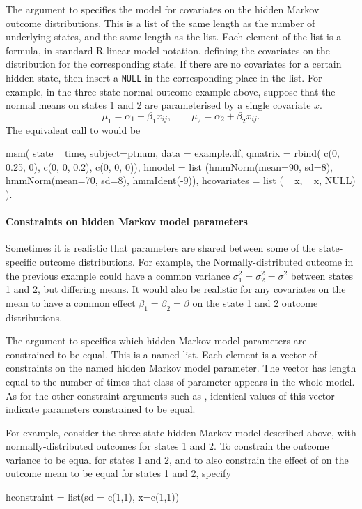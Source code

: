 The  argument to  specifies the
model for covariates on the hidden Markov outcome distributions.  This
is a list of the same length as the number of underlying states, and
the same length as the  list.  Each element of the
list is a formula, in standard R linear model notation, defining the
covariates on the distribution for the corresponding state.  If there
are no covariates for a certain hidden state, then insert a \texttt{NULL} in
the corresponding place in the list.  For example, in the three-state
normal-outcome example above, suppose that the normal means on states
1 and 2 are parameterised by a single covariate $x$.
\[
\mu_1 = \alpha_1 + \beta_1 x_{ij}, \qquad \mu_2 = \alpha_2 + \beta_2 x_{ij}.
\]
The equivalent call to  would be
\begin{Scode}
  msm( state ~ time, subject=ptnum, data = example.df,
  qmatrix = rbind( c(0, 0.25, 0), c(0, 0, 0.2), c(0, 0, 0)),
  hmodel = list (hmmNorm(mean=90, sd=8), hmmNorm(mean=70, sd=8),
                 hmmIdent(-9)),
  hcovariates = list ( ~ x, ~ x, NULL)
 ).
\end{Scode}



\paragraph{Constraints on hidden Markov model parameters}

Sometimes it is realistic that parameters are shared between some of
the state-specific outcome distributions.  For example, the
Normally-distributed outcome in the previous example could have a
common variance $\sigma^2_1 = \sigma^2_2 = \sigma^2$ between states 1
and 2, but differing means.  It would also be realistic for any
covariates on the mean to have a common effect $\beta_1 = \beta_2 =
\beta$ on the state 1 and 2 outcome distributions.

The argument  to  specifies which
hidden Markov model parameters are constrained to be equal.  This is a
named list.  Each element is a vector of constraints on the named
hidden Markov model parameter. The vector has length equal to the
number of times that class of parameter appears in the whole model.
As for the other constraint arguments such as ,
identical values of this vector indicate parameters constrained to be
equal.

For example, consider the three-state hidden Markov model described
above, with normally-distributed outcomes for states 1 and 2.
To constrain the outcome variance to be equal for states 1 and 2,
and to also constrain the effect of  on the outcome mean
to be equal for states 1 and 2, specify
\begin{Scode}
hconstraint = list(sd = c(1,1), x=c(1,1))
\end{Scode}

